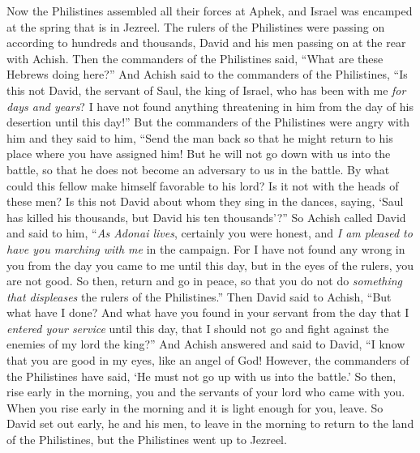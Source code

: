 \begin{biblechapter} %
 Now the Philistines assembled all their forces at Aphek, and Israel was encamped at the spring that is in Jezreel.
\verse The rulers of the Philistines were passing on according to hundreds and thousands, David and his men passing on at the rear with Achish.
\verse Then the commanders of the Philistines said, “What are these Hebrews doing here?” And Achish said to the commanders of the Philistines, “Is this not David, the servant of Saul, the king of Israel, who has been with me \textit{for days and years}? I have not found anything threatening in him from the day of his desertion until this day!”
\verse But the commanders of the Philistines were angry with him and they said to him, “Send the man back so that he might return to his place where you have assigned him! But he will not go down with us into the battle, so that he does not become an adversary to us in the battle. By what could this fellow make himself favorable to his lord? Is it not with the heads of these men?
\verse Is this not David about whom they sing in the dances, saying, ‘Saul has killed his thousands, 
but David his ten thousands’?”
\verse So Achish called David and said to him, “\textit{As Adonai lives}, certainly you were honest, and \textit{I am pleased to have you marching with me} in the campaign. For I have not found any wrong in you from the day you came to me until this day, but in the eyes of the rulers, you are not good.
\verse So then, return and go in peace, so that you do not do \textit{something that displeases} the rulers of the Philistines.”
\verse Then David said to Achish, “But what have I done? And what have you found in your servant from the day that I \textit{entered your service} until this day, that I should not go and fight against the enemies of my lord the king?”
\verse And Achish answered and said to David, “I know that you are good in my eyes, like an angel of God! However, the commanders of the Philistines have said, ‘He must not go up with us into the battle.’
\verse So then, rise early in the morning, you and the servants of your lord who came with you. When you rise early in the morning and it is light enough for you, leave.
\verse So David set out early, he and his men, to leave in the morning to return to the land of the Philistines, but the Philistines went up to Jezreel.
\end{biblechapter}

